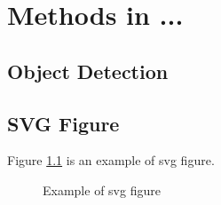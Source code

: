 \chapter{Methods in ...}

\section{Object Detection}






\section{SVG Figure}
Figure \ref{fig:example_svg} is an example of svg figure.

\begin{figure}[H]
  \centering
  
  \caption{Example of svg figure}
  \label{fig:example_svg}
\end{figure}
